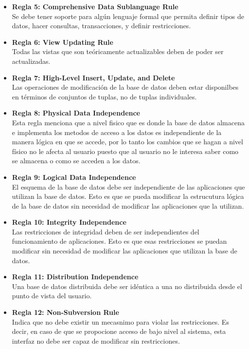 \documentclass{article}
\begin{document}
\begin{itemize}
    	\item\textbf{Regla 5: Comprehensive Data Sublanguage Rule}\\
        Se debe tener soporte para algún lenguaje formal que permita definir tipos
        de datos, hacer consultas, transacciones, y definir restricciones.
    	\item\textbf{Regla 6: View Updating Rule}\\
        Todas las vistas que son teóricamente actualizables deben de poder ser 
        actualizadas.
    	\item\textbf{Regla 7: High-Level Insert, Update, and Delete}\\
        Las operaciones de modificación de la base de datos deben estar 
        disponilbes en términos de conjuntos de tuplas, no de tuplas individuales.
    	\item\textbf{Regla 8: Physical Data Independence}\\
        Esta regla menciona que a nivel fisico que es donde la base de datos 
        almacena e implementa los metodos de acceso a los datos es independiente 
        de la manera lógica en que se accede, por lo tanto los cambios que se 
        hagan a nivel físico no le afecta al usuario puesto que al usuario no le 
        interesa saber como se almacena o como se acceden a los datos. 
    	\item\textbf{Regla 9: Logical Data Independence}\\
        El esquema de la base de datos debe ser independiente de las aplicaciones
        que utilizan la base de datos. Esto es que se pueda modificar la estrucutura
        lógica de la base de datos sin necesidad de modificar las aplicaciones que
        la utilizan.
    	\item\textbf{Regla 10: Integrity Independence}\\
        Las restricciones de integridad deben de ser independientes del 
        funcionamiento de aplicaciones. Esto es que esas restricciones se puedan
        modificar sin necesidad de modificar las aplicaciones que utilizan la 
        base de datos.
    	\item\textbf{Regla 11: Distribution Independence}\\
        Una base de datos distribuida debe ser idéntica a una no distribuida 
        desde el punto de vista del usuario.
    	\item\textbf{Regla 12: Non-Subversion Rule}\\
        Indica que no debe existir un mecasnimo para violar las restricciones.
        Es decir, en caso de que se propocione acceso de bajo nivel al sistema, 
        esta interfaz no debe ser capaz de modificar sin restricciones.
    	
    \end{itemize}
\end{document}
